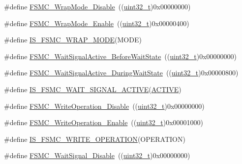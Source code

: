 \begin{DoxyCompactItemize}
\#define \hyperlink{group___f_s_m_c___wrap___mode_ga6041f0d3055ea3811a5a19560092f266}{F\+S\+M\+C\+\_\+\+Wrap\+Mode\+\_\+\+Disable}~((\hyperlink{_p_e___types_8h_a33594304e786b158f3fb30289278f5af}{uint32\+\_\+t})0x00000000)
\item 
\#define \hyperlink{group___f_s_m_c___wrap___mode_gad07eb0ae0362b2f94071d0dab6473fda}{F\+S\+M\+C\+\_\+\+Wrap\+Mode\+\_\+\+Enable}~((\hyperlink{_p_e___types_8h_a33594304e786b158f3fb30289278f5af}{uint32\+\_\+t})0x00000400)
\item 
\#define \hyperlink{group___f_s_m_c___wrap___mode_ga0751d74b7fb1e17f6cedea091e8ebfc8}{I\+S\+\_\+\+F\+S\+M\+C\+\_\+\+W\+R\+A\+P\+\_\+\+M\+O\+DE}(M\+O\+DE)
\item 
\#define \hyperlink{group___f_s_m_c___wait___timing_ga62c6855a7cc65b20024085f09cdc65e8}{F\+S\+M\+C\+\_\+\+Wait\+Signal\+Active\+\_\+\+Before\+Wait\+State}~((\hyperlink{_p_e___types_8h_a33594304e786b158f3fb30289278f5af}{uint32\+\_\+t})0x00000000)
\item 
\#define \hyperlink{group___f_s_m_c___wait___timing_gae905fc59e5d99091d132d7c221c8b6d4}{F\+S\+M\+C\+\_\+\+Wait\+Signal\+Active\+\_\+\+During\+Wait\+State}~((\hyperlink{_p_e___types_8h_a33594304e786b158f3fb30289278f5af}{uint32\+\_\+t})0x00000800)
\item 
\#define \hyperlink{group___f_s_m_c___wait___timing_ga3edb40c756afa8bb78550b7e22ded093}{I\+S\+\_\+\+F\+S\+M\+C\+\_\+\+W\+A\+I\+T\+\_\+\+S\+I\+G\+N\+A\+L\+\_\+\+A\+C\+T\+I\+VE}(\hyperlink{group___u_a_r_t___public___types_ggada493f726a4ea247b209b49fb8c85a52a33cf1d8ef1d06ee698a7fabf40eb3a7f}{A\+C\+T\+I\+VE})
\item 
\#define \hyperlink{group___f_s_m_c___write___operation_ga74176320484248f06abae854170f9d9f}{F\+S\+M\+C\+\_\+\+Write\+Operation\+\_\+\+Disable}~((\hyperlink{_p_e___types_8h_a33594304e786b158f3fb30289278f5af}{uint32\+\_\+t})0x00000000)
\item 
\#define \hyperlink{group___f_s_m_c___write___operation_ga2478beb6dd8861b34a16b8a57a795e56}{F\+S\+M\+C\+\_\+\+Write\+Operation\+\_\+\+Enable}~((\hyperlink{_p_e___types_8h_a33594304e786b158f3fb30289278f5af}{uint32\+\_\+t})0x00001000)
\item 
\#define \hyperlink{group___f_s_m_c___write___operation_ga87fc20d11761caa66c3e7d77a3a7d3e3}{I\+S\+\_\+\+F\+S\+M\+C\+\_\+\+W\+R\+I\+T\+E\+\_\+\+O\+P\+E\+R\+A\+T\+I\+ON}(O\+P\+E\+R\+A\+T\+I\+ON)
\item 
\#define \hyperlink{group___f_s_m_c___wait___signal_ga6ea66c8ddee073281c421533bdff7e19}{F\+S\+M\+C\+\_\+\+Wait\+Signal\+\_\+\+Disable}~((\hyperlink{_p_e___types_8h_a33594304e786b158f3fb30289278f5af}{uint32\+\_\+t})0x00000000)

\end{DoxyCompactItemize}

